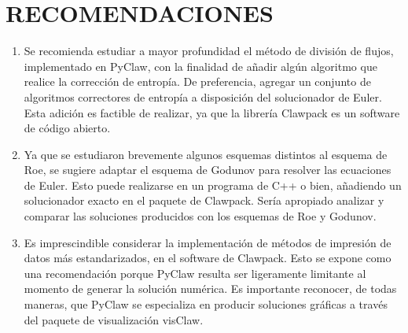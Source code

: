 \chapter{RECOMENDACIONES}
\begin{enumerate}
	\item Se recomienda estudiar a mayor profundidad el método de división de flujos, implementado en PyClaw, con la finalidad de añadir algún algoritmo que realice la corrección de entropía. De preferencia, agregar un conjunto de algoritmos correctores de entropía a disposición del solucionador de Euler. Esta adición es factible de realizar, ya que la librería Clawpack es un software de código abierto.
	\item Ya que se estudiaron brevemente algunos esquemas distintos al esquema de Roe, se sugiere adaptar el esquema de Godunov para resolver las ecuaciones de Euler. Esto puede realizarse en un programa de C++ o bien, añadiendo un solucionador exacto en el paquete de Clawpack. Sería apropiado analizar y comparar las soluciones producidos con los esquemas de Roe y Godunov.
	\item Es imprescindible considerar la implementación de métodos de impresión de datos más estandarizados, en el software de Clawpack. Esto se expone como una recomendación porque PyClaw resulta ser ligeramente limitante al momento de generar la solución numérica. Es importante reconocer, de todas maneras, que PyClaw se especializa en producir soluciones gráficas a través del paquete de visualización visClaw.
\end{enumerate}
